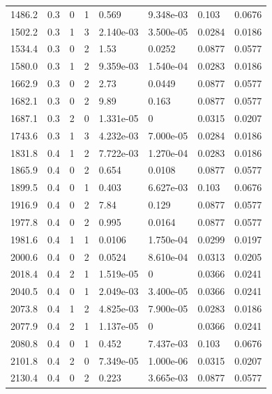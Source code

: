 \documentclass[preview]{standalone}
\begin{document}
{{{\begin{tabular}{L{1.2cm}C{1.2cm} C{0.3cm}C{0.5cm} C{1.4cm}C{1.4cm} C{1.4cm}C{1.4cm}}
  1486.2  &   0.3  & 0     &  1 &  0.569  & 9.348e-03  & 0.103 &  0.0676   \\ 
  1502.2  &   0.3  & 1     &  3 &  2.140e-03  & 3.500e-05  & 0.0284 &  0.0186   \\ 
  1534.4  &   0.3  & 0     &  2 &  1.53  & 0.0252  & 0.0877 &  0.0577   \\ 
  1580.0  &   0.3  & 1     &  2 &  9.359e-03  & 1.540e-04  & 0.0283 &  0.0186   \\ 
  1662.9  &   0.3  & 0     &  2 &  2.73  & 0.0449  & 0.0877 &  0.0577   \\ 
  1682.1  &   0.3  & 0     &  2 &  9.89  & 0.163  & 0.0877 &  0.0577   \\ 
  1687.1  &   0.3  & 2     &  0 &  1.331e-05  & 0  & 0.0315 &  0.0207   \\ 
  1743.6  &   0.3  & 1     &  3 &  4.232e-03  & 7.000e-05  & 0.0284 &  0.0186   \\ 
  1831.8  &   0.4  & 1     &  2 &  7.722e-03  & 1.270e-04  & 0.0283 &  0.0186   \\ 
  1865.9  &   0.4  & 0     &  2 &  0.654  & 0.0108  & 0.0877 &  0.0577   \\ 
  1899.5  &   0.4  & 0     &  1 &  0.403  & 6.627e-03  & 0.103 &  0.0676   \\ 
  1916.9  &   0.4  & 0     &  2 &  7.84  & 0.129  & 0.0877 &  0.0577   \\ 
  1977.8  &   0.4  & 0     &  2 &  0.995  & 0.0164  & 0.0877 &  0.0577   \\ 
  1981.6  &   0.4  & 1     &  1 &  0.0106  & 1.750e-04  & 0.0299 &  0.0197   \\ 
  2000.6  &   0.4  & 0     &  2 &  0.0524  & 8.610e-04  & 0.0313 &  0.0205   \\ 
  2018.4  &   0.4  & 2     &  1 &  1.519e-05  & 0  & 0.0366 &  0.0241   \\ 
  2040.5  &   0.4  & 0     &  1 &  2.049e-03  & 3.400e-05  & 0.0366 &  0.0241   \\ 
  2073.8  &   0.4  & 1     &  2 &  4.825e-03  & 7.900e-05  & 0.0283 &  0.0186   \\ 
  2077.9  &   0.4  & 2     &  1 &  1.137e-05  & 0  & 0.0366 &  0.0241   \\ 
  2080.8  &   0.4  & 0     &  1 &  0.452  & 7.437e-03  & 0.103 &  0.0676   \\ 
  2101.8  &   0.4  & 2     &  0 &  7.349e-05  & 1.000e-06  & 0.0315 &  0.0207   \\ 
  2130.4  &   0.4  & 0     &  2 &  0.223  & 3.665e-03  & 0.0877 &  0.0577   \\ 

\end{tabular}}}}
\end{document}
